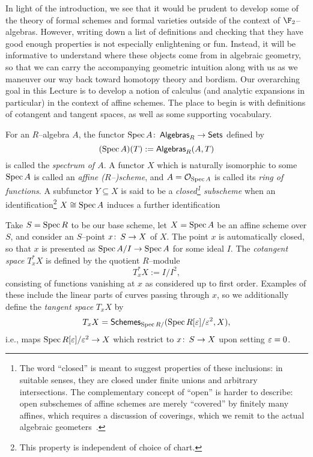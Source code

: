 In light of the introduction, we see that it would be prudent to develop some of the theory of formal schemes and formal varieties outside of the context of $\F_2$--algebras.  However, writing down a list of definitions and checking that they have good enough properties is not especially enlightening or fun.  Instead, it will be informative to understand where these objects come from in algebraic geometry, so that we can carry the accompanying geometric intuition along with us as we maneuver our way back toward homotopy theory and bordism.  Our overarching goal in this Lecture is to develop a notion of calculus (and analytic expansions in particular) in the context of affine schemes.  The place to begin is with definitions of cotangent and tangent spaces, as well as some supporting vocabulary.
\begin{definition}
For an $R$--algebra $A$, the functor $\operatorname{Spec} A \colon\thinspace \mathsf{Algebras}_R \to \mathsf{Sets}$ defined by \[(\operatorname{Spec} A)(T) := \mathsf{Algebras}_R(A, T)\] is called the \textit{spectrum of $A$}.  A functor $X$ which is naturally isomorphic to some $\operatorname{Spec} A$ is called an \textit{affine ($R$--)scheme}, and $A = \mathcal{O}_{\operatorname{Spec} A}$ is called its \textit{ring of functions}.  A subfunctor $Y \subseteq X$ is said to be a \textit{closed\footnote{The word ``closed'' is meant to suggest properties of these inclusions: in suitable senses, they are closed under finite unions and arbitrary intersections.  The complementary concept of ``open'' is harder to describe: open subschemes of affine schemes are merely ``covered'' by finitely many affines, which requires a discussion of coverings, which we remit to the actual algebraic geometers~\cite[Definition 8.1]{StricklandFPFP}.} subscheme} when an identification\footnote{This property is independent of choice of chart.} $X \cong \operatorname{Spec} A$ induces a further identification
\begin{center}
\end{center}
\end{definition}

\begin{definition}\label{DefnOfCoTangentSpaces}
Take $S = \operatorname{Spec} R$ to be our base scheme, let $X = \operatorname{Spec} A$ be an affine scheme over $S$, and consider an $S$--point $x\colon\thinspace S \to X$ of $X$.  The point $x$ is automatically closed, so that $x$ is presented as $\operatorname{Spec} A/I \to \operatorname{Spec} A$ for some ideal $I$.  The \textit{cotangent space} $T^*_x X$ is defined by the quotient $R$--module \[T^*_x X := I / I^2,\] consisting of functions vanishing at $x$ as considered up to first order.  Examples of these include the linear parts of curves passing through $x$, so we additionally define the \textit{tangent space} $T_x X$ by \[T_x X = \mathsf{Schemes}_{\operatorname{Spec} R/}(\operatorname{Spec} R[\varepsilon] / \varepsilon^2, X),\] i.e., maps $\operatorname{Spec} R[\varepsilon] / \varepsilon^2 \to X$ which restrict to $x\colon\thinspace S \to X$ upon setting $\varepsilon = 0$.
\end{definition}

